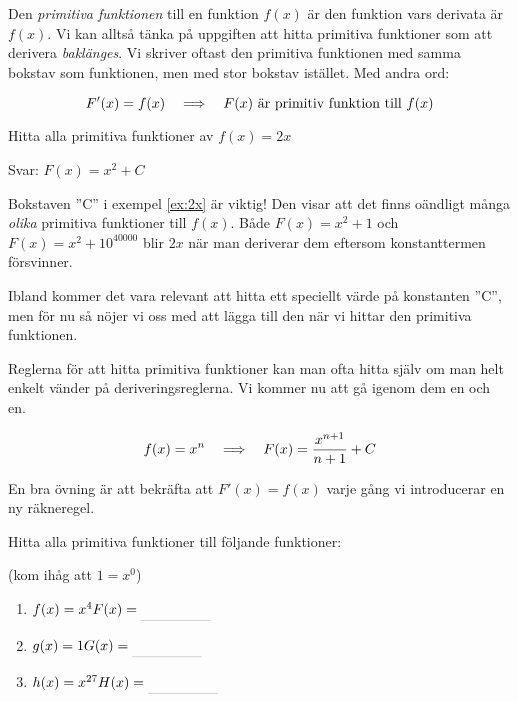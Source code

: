 \documentclass[a4paper, 12pt]{article}
\begin{document}
Den \emph{primitiva funktionen} till en funktion $f(x)$ är den funktion vars derivata är $f(x)$. Vi kan alltså tänka på uppgiften att hitta primitiva funktioner som att derivera \emph{baklänges}. Vi skriver oftast den primitiva funktionen med samma bokstav som funktionen, men med stor bokstav istället. Med andra ord:

\[F'(x) = f(x) \hspace{1em} \Longrightarrow \hspace{1em} F(x) \textrm{ är primitiv funktion till } f(x)\]


\begin{exempel}
    \label{ex:2x}
    Hitta alla primitiva funktioner av $f(x) = 2x$

    Svar: $F(x) = x^2 + C$
\end{exempel}

Bokstaven ''C'' i exempel \ref{ex:2x} är viktig! Den visar att det finns oändligt många \emph{olika} primitiva funktioner till $f(x)$. Både $F(x) = x^2 + 1$ och $F(x) = x^2 + 10^{40000}$ blir $2x$ när man deriverar dem eftersom konstanttermen försvinner.

Ibland kommer det vara relevant att hitta ett speciellt värde på konstanten ''C'', men för nu så nöjer vi oss med att lägga till den när vi hittar den primitiva funktionen.

Reglerna för att hitta primitiva funktioner kan man ofta hitta själv om man helt enkelt vänder på deriveringsreglerna. Vi kommer nu att gå igenom dem en och en.


\begin{regel}
    \label{reg:x^n}
    \[f(x) = x^n \hspace{1em} \Longrightarrow \hspace{1em} F(x) = \dfrac {x^{n+1}}{n+1} + C\]
\end{regel}

En bra övning är att bekräfta att $F'(x) = f(x)$ varje gång vi introducerar en ny räkneregel.

\begin{uppgifter}
    \label{upp:x^n}
    Hitta alla primitiva funktioner till följande funktioner: 
    
    (kom ihåg att $1=x^0$)
    \begin{multicols}{3}
        \begin{enumerate}
            \item $f(x) = x^4 \\ F(x) \ans$
            \item $g(x) = 1 \\ G(x) \ans$
            \item $h(x) = x^{27} \\ H(x) \ans$
        \end{enumerate}
    \end{multicols}
\end{uppgifter}
\end{document}

